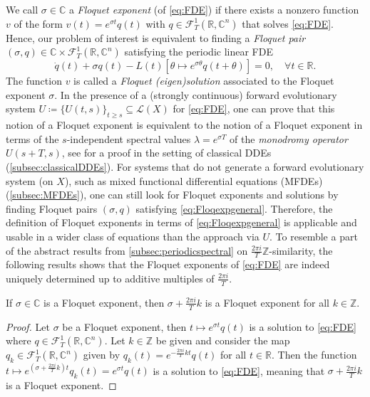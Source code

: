 \documentclass[english]{myarticle}
\begin{document}
\begin{sloppypar}
We call $\sigma \in \mathbb{C}$ a \emph{Floquet exponent} (of \eqref{eq:FDE}) if there exists a nonzero function $v$ of the form $v(t) = e^{\sigma t} q(t)$ with $q \in \mathcal{F}_T^1(\mathbb{R},\mathbb{C}^n)$ that solves \eqref{eq:FDE}. Hence, our problem of interest is equivalent to finding a \emph{Floquet pair} $(\sigma,q) \in \mathbb{C} \times \mathcal{F}_T^1(\mathbb{R},\mathbb{C}^n)$ satisfying the periodic linear FDE
\begin{equation} \label{eq:Floqexpgeneral}
    \dot{q}(t) + \sigma q(t) - L(t)[\theta \mapsto e^{\sigma \theta} q(t + \theta)] = 0, \quad \forall t \in \mathbb{R}.
\end{equation}
The function $v$ is called a \emph{Floquet (eigen)solution} associated to the Floquet exponent $\sigma$. In the presence of a (strongly continuous) forward evolutionary system $U \coloneqq \{U(t,s)\}_{t \geq s} \subseteq \mathcal{L}(X)$ for \eqref{eq:FDE}, one can prove that this notion of a Floquet exponent is equivalent to the notion of a Floquet exponent in terms of the $s$-independent spectral values $\lambda = e^{\sigma T}$ of the \emph{monodromy operator} $U(s+T,s)$, see \cite[Lemma 8.1.2]{Hale1993} for a proof in the setting of classical DDEs (\cref{subsec:classicalDDEs}). For systems that do not generate a forward evolutionary system (on $X$), such as mixed functional differential equations (MFDEs) (\cref{subsec:MFDEs}), one can still look for Floquet exponents and solutions by finding Floquet pairs $(\sigma,q)$ satisfying \eqref{eq:Floqexpgeneral}. Therefore, the definition of Floquet exponents in terms of \eqref{eq:Floqexpgeneral} is applicable and usable in a wider class of equations than the approach via $U$. To resemble a part of the abstract results from \cref{subsec:periodicspectral} on $\frac{2 \pi i }{T} \mathbb{Z}$-similarity, the following results shows that the Floquet exponents of \eqref{eq:FDE} are indeed uniquely determined up to additive multiples of $\frac{2 \pi i}{T}$.
\begin{proposition} \label{prop:Floquetexpunique}
If $\sigma \in \mathbb{C}$ is a Floquet exponent, then $\sigma + \frac{2 \pi i}{T}k$ is a Floquet exponent for all $k \in \mathbb{Z}$.
\end{proposition}
\begin{proof}
Let $\sigma$ be a Floquet exponent, then $t \mapsto e^{\sigma t}q(t)$ is a solution to \eqref{eq:FDE} where $q \in \mathcal{F}_T^1(\mathbb{R},\mathbb{C}^n)$. Let $k \in \mathbb{Z}$ be given and consider the map $q_k \in \mathcal{F}_T^1(\mathbb{R},\mathbb{C}^n)$ given by $q_k(t) = e^{-\frac{2 \pi i}{T}kt}q(t)$ for all $t \in \mathbb{R}$. Then the function $t \mapsto e^{(\sigma + \frac{2 \pi i}{T}k)t} q_k(t) = e^{\sigma t}q(t)$ is a solution to \eqref{eq:FDE}, meaning that $\sigma + \frac{2 \pi i}{T}k$ is a Floquet exponent. 

\end{proof}
\end{sloppypar}
\end{document}
